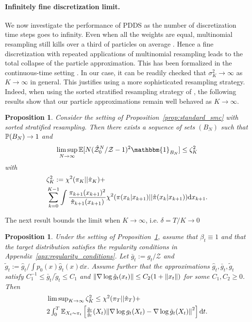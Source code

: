 \documentclass{article}
\theoremstyle{plain}
\newtheorem{proposition}[theorem]{Proposition}
\theoremstyle{definition}
\theoremstyle{remark}
\begin{document}
\paragraph{Infinitely fine discretization limit.} We now investigate the performance of PDDS as the number of discretization time steps goes to infinity. Even when all the weights are equal, multinomial resampling still kills over a third of particles on average \citep{chopin2020book}. Hence a fine discretization with repeated applications of multinomial resampling leads to the total collapse of the particle approximation. This has been formalized in the continuous-time setting \citep{chopin2022resampling}. In our case, it can be readily checked that $\sigma_K^2 \to \infty$ as $K \to \infty$ in general. This justifies using a more sophisticated resampling strategy. Indeed, when using the sorted stratified resampling strategy of \citet{gerber2019negative}, the following results show that our particle approximations remain well behaved as $K \rightarrow \infty$.
\newcommand{\ssK}{\sigma_{K*}}
\begin{proposition}
	\label{prop:smc_sorted}
	Consider the setting of Proposition~\ref{prop:standard_smc} with sorted stratified resampling. Then there exists a sequence of sets $(B_N)$ such that $\P(B_N) \to 1$ and
	\begin{equation*}
		\limsup_{N \to \infty} \E[N(\hmc^N_0/\mathcal Z - 1)^2 \mathbbm{1}_{B_N}] \leq \zeta^2_K %
	\end{equation*}
	with
	\begin{align*}
		 & \zeta^2_K:= \chisquared{\pi_K}{\hat \pi_K}+                                                                                                \\
		 & \sum_{k=0}^{K-1} \int\frac{\pi_{k+1}(x_{k+1})^2}{\hat\pi_{k+1}(x_{k+1})} \chisquared{\pi(x_k|x_{k+1})}{\hat \pi(x_k|x_{k+1})} \dd x_{k+1}.
	\end{align*}
\end{proposition}
The next result bounds the limit when $K \to\infty$, i.e. $\delta=T/K \rightarrow 0$
\newcommand{\barhat}[1]{\bar{\hat #1}}
\begin{proposition}
	\label{prop:error_K_infinite}
	Under the setting of Proposition~\ref{prop:smc_sorted}, assume that $\beta_t \equiv 1$ and that the target distribution satisfies the regularity conditions in Appendix~\ref{apx:regularity_conditions}. Let $\bar g_t:= g_t/\mathcal Z$ and $\tilde g_t:= \hat g_t/\int p_0(x) \hat g_t(x) \dd x$. Assume further that the approximations $\hat g_t, \bar g_t, \tilde g_t$ satisfy $C_1^{-1} \leq \bar g_t/\tilde g_t \leq C_1$ and $\norm{ \gradlog \hat g_t(x_t)} \leq C_2(1 +\norm{x_t})$ for some $C_1, C_2 \geq 0$. Then
	\begin{align*}
		 & \textstyle \limsup_{K\to\infty} \zeta^2_K \leq \chisquared{\pi_T}{\hat \pi_T} +
		\\ & \textstyle 2\int_0^T \E_{X_t \sim \pi_t}\ps{\frac{\bar g_t}{\tilde g_t}(X_t)\norm{\gradlog g_t(X_t) - \gradlog \hat g_t(X_t)}^2} \dd t.
	\end{align*}
\end{proposition}
\end{document}
